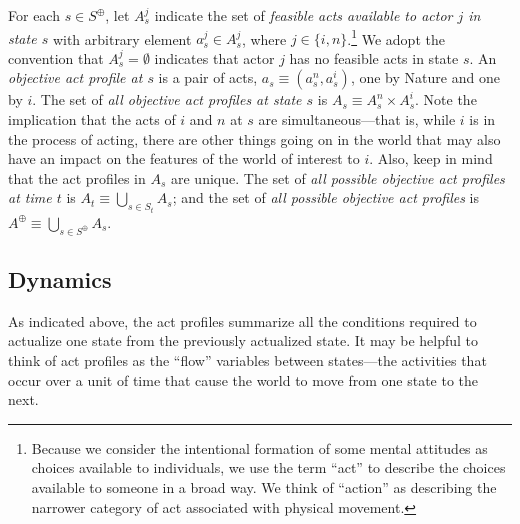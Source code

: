 \documentclass[
11pt,
titlepage,
reqno,
]{article}%
\theoremstyle{definition}
\begin{document}
For each  $s\in S^\oplus$, let $A^j_s$ indicate the set of \textit{feasible acts available to actor $j$ in state $s$} with arbitrary element $a^j_s\in A^j_s$, where $j\in\{i,n\}$.\footnote
{
	Because we consider the intentional formation of some mental attitudes as choices available to individuals, we use the term ``act'' to describe the choices available to someone in a broad way.
	We think of ``action'' as describing the narrower category of act associated with physical movement.
} 
We adopt the convention that $A^j_s=\emptyset$ indicates that actor $j$ has no feasible acts in state $s$.
An \textit{objective act profile at $s$}  is a pair of acts, $a_s\equiv(a^n_s,a^i_s)$, one by Nature and one by $i$. 
The set of \textit{all objective act profiles at state $s$} is $A_s\equiv A^n_s\times A^i_s$.
Note the implication that the acts of $i$ and $n$ at $s$ are simultaneous---that is, while $i$ is in the process of acting, there are other things going on in the world that may also have an impact on the features of the world of interest to $i$.
Also, keep in mind that the act profiles in $A_s$ are unique.
The set of \textit{all possible objective act profiles at time $t$} is  $A_t\equiv \bigcup_{s\in S_t} A_s$; and the set of \textit{all possible objective act profiles} is $A^\oplus\equiv \bigcup_{s\in S^\oplus} A_s$. 
	
 
	
\subsection{Dynamics} 
	
As indicated above, the act profiles summarize all the conditions required to actualize one state from the previously actualized state. 	It may be helpful to think of act profiles as the ``flow'' variables between states---the activities that occur over a unit of time that cause the world to move from one state to the next.
	
\end{document}
